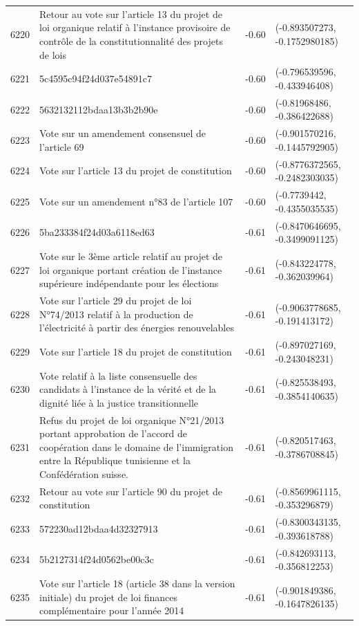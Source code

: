 \begin{table}[ht]
\begin{tabular}{rlrl}
  6220 & Retour au vote sur l'article 13 du projet de loi organique relatif à l'instance provisoire de contrôle de la constitutionnalité des projets de lois & -0.60 & (-0.893507273, -0.1752980185) \\ 
  6221 & 5c4595c94f24d037e54891c7 & -0.60 & (-0.796539596, -0.433946408) \\ 
  6222 & 5632132112bdaa13b3b2b90e & -0.60 & (-0.81968486, -0.386422688) \\ 
  6223 & Vote sur un amendement consensuel de l'article 69 & -0.60 & (-0.901570216, -0.1445792905) \\ 
  6224 & Vote sur l'article 13 du projet de constitution & -0.60 & (-0.8776372565, -0.2482303035) \\ 
  6225 & Vote sur un amendement n°83 de l'article 107 & -0.60 & (-0.7739442, -0.4355035535) \\ 
  6226 & 5ba233384f24d03a6118ed63 & -0.61 & (-0.8470646695, -0.3499091125) \\ 
  6227 & Vote sur le 3ème article relatif au projet de loi organique portant création de l'instance supérieure indépendante pour les élections & -0.61 & (-0.843224778, -0.362039964) \\ 
  6228 & Vote sur l'article 29 du projet de loi N°74/2013 relatif à la production de l'électricité à partir des énergies renouvelables & -0.61 & (-0.9063778685, -0.191413172) \\ 
  6229 & Vote sur l'article 18 du projet de constitution & -0.61 & (-0.897027169, -0.243048231) \\ 
  6230 & Vote relatif à la liste consensuelle des candidats à l'instance de la vérité et de la dignité liée à la justice transitionnelle & -0.61 & (-0.825538493, -0.3854140635) \\ 
  6231 & Refus du projet de loi organique N°21/2013 portant approbation de l'accord de coopération dans le domaine de l'immigration entre la République tunisienne et la Confédération suisse. & -0.61 & (-0.820517463, -0.3786708845) \\ 
  6232 & Retour au vote sur l'article 90 du projet de constitution & -0.61 & (-0.8569961115, -0.353296879) \\ 
  6233 & 572230ad12bdaa4d32327913 & -0.61 & (-0.8300343135, -0.393618788) \\ 
  6234 & 5b2127314f24d0562be00c3c & -0.61 & (-0.842693113, -0.356812253) \\ 
  6235 & Vote sur l'article 18 (article 38 dans la version initiale) du projet de loi finances complémentaire pour l'année 2014 & -0.61 & (-0.901849386, -0.1647826135) \\ 

\end{tabular}
\end{table}
